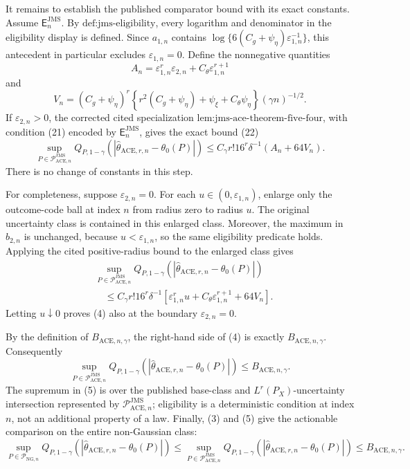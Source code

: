It remains to establish the published comparator bound with its exact
constants.  Assume \(\mathsf E_n^{\mathrm{JMS}}\).  By
\(\text{def:jms-eligibility}\), every logarithm and denominator in the
eligibility display is defined.  Since \(a_{1,n}\) contains
\(\log\{6(C_g+\psi_\eta)\varepsilon_{1,n}^{-1}\}\), this antecedent
in particular excludes \(\varepsilon_{1,n}=0\).  Define the
nonnegative quantities
\[
 A_n=\varepsilon_{1,n}^{r}\varepsilon_{2,n}
       +C_\theta\varepsilon_{1,n}^{r+1}
\]
and
\[
 V_n=(C_g+\psi_\eta)^r
 \left\{r^2(C_g+\psi_\eta)+\psi_\xi+C_\theta\psi_\eta\right\}
 (\gamma n)^{-1/2}.
\]
If \(\varepsilon_{2,n}>0\), the corrected cited specialization
\(\text{lem:jms-ace-theorem-five-four}\), with condition (21) encoded by
\(\mathsf E_n^{\mathrm{JMS}}\), gives the exact bound (22)
\[
 \sup_{P\in\mathcal P_{\mathrm{ACE},n}^{\mathrm{JMS}}}
 Q_{P,1-\gamma}
 \!\left(|\widehat\theta_{\mathrm{ACE},r,n}-\theta_0(P)|\right)
 \le C_\gamma r!16^r\delta^{-1}(A_n+64V_n).             \tag{4}
\]
There is no change of constants in this step.

For completeness, suppose \(\varepsilon_{2,n}=0\).  For each
\(u\in(0,\varepsilon_{1,n})\), enlarge only the outcome-code ball at
index \(n\) from radius zero to radius \(u\).  The original uncertainty
class is contained in this enlarged class.  Moreover, the maximum in
\(b_{2,n}\) is unchanged, because \(u<\varepsilon_{1,n}\), so the same
eligibility predicate holds.  Applying the cited positive-radius bound
to the enlarged class gives
\[
 \begin{aligned}
 &\sup_{P\in\mathcal P_{\mathrm{ACE},n}^{\mathrm{JMS}}}
 Q_{P,1-\gamma}
 \!\left(|\widehat\theta_{\mathrm{ACE},r,n}-\theta_0(P)|\right)\\
 &\quad\le C_\gamma r!16^r\delta^{-1}
 \left[\varepsilon_{1,n}^{r}u+C_\theta\varepsilon_{1,n}^{r+1}
 +64V_n\right].
 \end{aligned}
\]
Letting \(u\downarrow0\) proves (4) also at the boundary
\(\varepsilon_{2,n}=0\).

By the definition of \(B_{\mathrm{ACE},n,\gamma}\), the right-hand side
of (4) is exactly \(B_{\mathrm{ACE},n,\gamma}\).  Consequently
\[
 \sup_{P\in\mathcal P_{\mathrm{ACE},n}^{\mathrm{JMS}}}
 Q_{P,1-\gamma}
 \!\left(|\widehat\theta_{\mathrm{ACE},r,n}-\theta_0(P)|\right)
 \le B_{\mathrm{ACE},n,\gamma}.                         \tag{5}
\]
The supremum in (5) is over the published base-class and
\(L^r(P_X)\)-uncertainty intersection represented by
\(\mathcal P_{\mathrm{ACE},n}^{\mathrm{JMS}}\); eligibility is a
deterministic condition at index \(n\), not an additional property of a
law.  Finally, (3) and (5) give the actionable comparison on the entire
non-Gaussian class:
\[
 \sup_{P\in\mathcal P_{\mathrm{NG},n}}
 Q_{P,1-\gamma}
 \!\left(|\widehat\theta_{\mathrm{ACE},r,n}-\theta_0(P)|\right)
 \le
 \sup_{P\in\mathcal P_{\mathrm{ACE},n}^{\mathrm{JMS}}}
 Q_{P,1-\gamma}
 \!\left(|\widehat\theta_{\mathrm{ACE},r,n}-\theta_0(P)|\right)
 \le B_{\mathrm{ACE},n,\gamma}.
\]